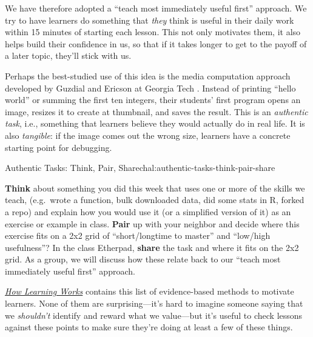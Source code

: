 We have therefore adopted a ``teach most immediately useful first''
approach. We try to have learners do something that \emph{they} think is
useful in their daily work within 15 minutes of starting each lesson.
This not only motivates them, it also helps build their confidence in
us, so that if it takes longer to get to the payoff of a later topic,
they'll stick with us.

Perhaps the best-studied use of this idea is the
media computation approach developed by Guzdial and Ericson at Georgia Tech
\cite{bib:guzdial-mediacomp-retrospective}.
Instead of printing ``hello world'' or summing the first ten integers,
their students' first program opens an image, resizes it to create at
thumbnail, and saves the result. This is an \emph{authentic task}, i.e.,
something that learners believe they would actually do in real life. It
is also \emph{tangible}: if the image comes out the wrong size, learners
have a concrete starting point for debugging.

\begin{challenge}{Authentic Tasks: Think, Pair, Share}{chal:authentic-tasks-think-pair-share}

\textbf{Think} about something you did this week that uses one or more
of the skills we teach, (e.g.~wrote a function, bulk downloaded data,
did some stats in R, forked a repo) and explain how you would use it (or
a simplified version of it) as an exercise or example in class.
\textbf{Pair} up with your neighbor and decide where this exercise fits
on a 2x2 grid of ``short/longtime to master'' and ``low/high
usefulness''? In the class Etherpad, \textbf{share} the task and where
it fits on the 2x2 grid. As a group, we will discuss how these relate
back to our ``teach most immediately useful first'' approach.
\end{challenge}


\emph{\href{http://www.amazon.com/How-Learning-Works-Research-Based-Jossey-Bass/dp/0470484101/}{How
Learning Works}} contains this list of evidence-based methods to
motivate learners. None of them are surprising---it's hard to imagine
someone saying that we \emph{shouldn't} identify and reward what we
value---but it's useful to check lessons against these points to make
sure they're doing at least a few of these things.

